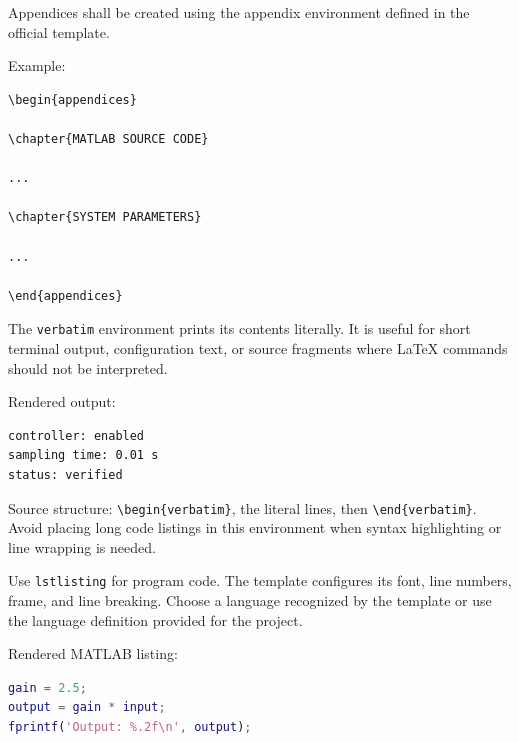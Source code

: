 {Appendices shall be created using the appendix environment defined
in the official template.

Example:

\begin{verbatim}
\begin{appendices}

\chapter{MATLAB SOURCE CODE}

...

\chapter{SYSTEM PARAMETERS}

...

\end{appendices}
\end{verbatim}


The \verb|verbatim| environment prints its contents literally. It is
useful for short terminal output, configuration text, or source
fragments where LaTeX commands should not be interpreted.

Rendered output:

\begin{verbatim}
controller: enabled
sampling time: 0.01 s
status: verified
\end{verbatim}

Source structure: \verb|\begin{verbatim}|, the literal lines, then
\verb|\end{verbatim}|. Avoid placing long code listings in this
environment when syntax highlighting or line wrapping is needed.


Use \verb|lstlisting| for program code. The template configures its
font, line numbers, frame, and line breaking. Choose a language
recognized by the template or use the language definition provided
for the project.

Rendered MATLAB listing:

\begin{lstlisting}[language=Matlab]
gain = 2.5;
output = gain * input;
fprintf('Output: %.2f\n', output);
\end{lstlisting}

}
